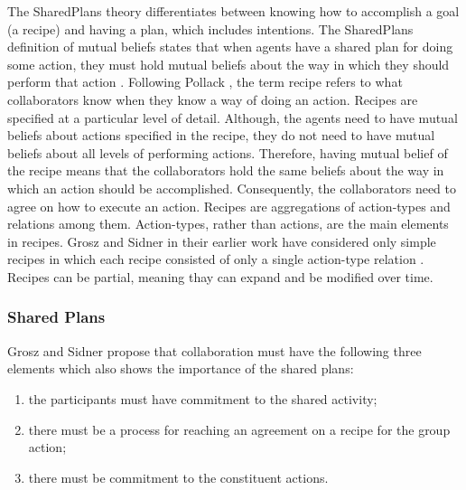 \documentclass[11pt]{article}
\begin{document}
The SharedPlans theory differentiates between knowing how to accomplish a goal
(a recipe) and having a plan, which includes intentions. The SharedPlans
definition of mutual beliefs states that when agents have a shared plan for
doing some action, they must hold mutual beliefs about the way in which they
should perform that action \cite{grosz:collaboration,grosz:plans-discourse}.
Following Pollack \cite{pollack:plan-mental-attitudes}, the term recipe refers
to what collaborators know when they know a way of doing an action. Recipes are
specified at a particular level of detail. Although, the agents need to have
mutual beliefs about actions specified in the recipe, they do not need to have
mutual beliefs about all levels of performing actions. Therefore, having mutual
belief of the recipe means that the collaborators hold the same beliefs about
the way in which an action should be accomplished. Consequently, the
collaborators need to agree on how to execute an action. Recipes are
aggregations of action-types and relations among them. Action-types, rather than
actions, are the main elements in recipes. Grosz and Sidner in their earlier
work \cite{grosz:plans-discourse} have considered only simple recipes in which
each recipe consisted of only a single action-type relation
\cite{lochbaum:plan-models}. Recipes can be partial, meaning thay can expand and
be modified over time.

\subsubsection{Shared Plans}
\label{sec:shared}

Grosz and Sidner propose that collaboration must have the following three
elements which also shows the importance of the shared plans:

\begin{enumerate}
  \item the participants must have commitment to the shared activity;
  \item there must be a process for reaching an agreement on a recipe for the
  group action;
  \item there must be commitment to the constituent actions. 
\end{enumerate}
\end{document}
